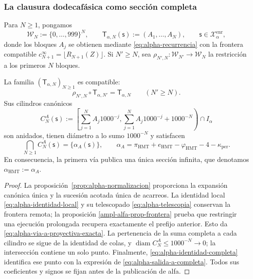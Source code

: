 \subsubsection{La clausura dodecafásica como sección completa}

Para \(N\geq1\), pongamos
\[
 \mathcal W_N:=\{0,\ldots,999\}^{N},
 \qquad
 \mathsf T_{\alpha,N}(\mathsf s):=(A_1,\ldots,A_N),
 \qquad \mathsf s\in\mathcal X_{\alpha}^{\mathrm{enr}},
\]
donde los bloques \(A_j\) se obtienen mediante
\eqref{eq:alpha-recurrencia} con la frontera compatible
\(c_{N+1}^{\infty}=\lfloor R_{N+1}(Z)\rfloor\). Si \(N'\geq N\), sea
\(\rho_{N',N}:\mathcal W_{N'}\to\mathcal W_N\) la restricción a los
primeros \(N\) bloques.

\begin{theorem}
\label{thm:alpha-salida-dodecafasica-completa}
La familia \((\mathsf T_{\alpha,N})_{N\geq1}\) es compatible:
\begin{equation}
 \rho_{N',N}\circ\mathsf T_{\alpha,N'}
 =\mathsf T_{\alpha,N}
 \qquad(N'\geq N).
 \label{eq:alpha-via-a-proyectiva-exacta}
\end{equation}
Sus cilindros canónicos
\begin{equation}
 C_N^A(\mathsf s):=
 \left[
  \sum_{j=1}^{N}A_j1000^{-j},
  \sum_{j=1}^{N}A_j1000^{-j}+1000^{-N}
 \right)\cap I_\alpha
 \label{eq:alpha-cilindros-via-a-exactos}
\end{equation}
son anidados, tienen diámetro a lo sumo \(1000^{-N}\) y satisfacen
\begin{equation}
 \bigcap_{N\geq1}C_N^A(\mathsf s)
 =\{\alpha_A(\mathsf s)\},
 \qquad
 \alpha_A
 =\pi_{\mathrm{HMT}}+e_{\mathrm{HMT}}-\varphi_{\mathrm{HMT}}
  -4-\kappa_{\mathrm{per}}.
 \label{eq:alpha-salida-a-completa}
\end{equation}
En consecuencia, la primera vía publica una única sección infinita, que
denotamos \(\alpha_{\mathrm{HMT}}:=\alpha_A\).
\end{theorem}

\begin{proof}
La proposición~\ref{prop:alpha-normalizacion} proporciona la expansión
canónica única y la sucesión acotada única de acarreos. La identidad local
\eqref{eq:alpha-identidad-local} y su telescopado
\eqref{eq:alpha-telescopia} conservan la frontera remota; la proposición
\ref{ampl-alfa-prop-frontera} prueba que restringir una ejecución prolongada
recupera exactamente el prefijo anterior. Esto da
\eqref{eq:alpha-via-a-proyectiva-exacta}. La pertenencia de la suma completa
a cada cilindro se sigue de la identidad de colas, y
\(\operatorname{diam}C_N^A\leq1000^{-N}\to0\); la intersección contiene un
solo punto. Finalmente, \eqref{eq:alpha-identidad-completa} identifica ese
punto con la expresión de \eqref{eq:alpha-salida-a-completa}. Todos sus
coeficientes y signos se fijan antes de la publicación de alfa.
\end{proof}

